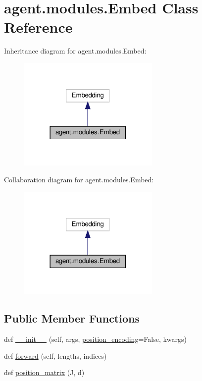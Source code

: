 \hypertarget{classagent_1_1modules_1_1Embed}{}\section{agent.\+modules.\+Embed Class Reference}
\label{classagent_1_1modules_1_1Embed}


Inheritance diagram for agent.\+modules.\+Embed\+:
\nopagebreak
\begin{figure}[H]
\begin{center}
\leavevmode
\includegraphics[width=194pt]{classagent_1_1modules_1_1Embed__inherit__graph}
\end{center}
\end{figure}


Collaboration diagram for agent.\+modules.\+Embed\+:
\nopagebreak
\begin{figure}[H]
\begin{center}
\leavevmode
\includegraphics[width=194pt]{classagent_1_1modules_1_1Embed__coll__graph}
\end{center}
\end{figure}
\subsection*{Public Member Functions}
\begin{DoxyCompactItemize}
\item 
def \hyperlink{classagent_1_1modules_1_1Embed_aeb8a118bbca535fb35d6b5a45c2603c2}{\+\_\+\+\_\+init\+\_\+\+\_\+} (self, args, \hyperlink{classagent_1_1modules_1_1Embed_a482a481bdc736280d0af174a15f6e8ee}{position\+\_\+encoding}=False, kwargs)
\item 
def \hyperlink{classagent_1_1modules_1_1Embed_aecd5510c339a8fd238d56226863dcb81}{forward} (self, lengths, indices)
\item 
def \hyperlink{classagent_1_1modules_1_1Embed_a5efae3b0a1994436b49124274cfc089f}{position\+\_\+matrix} (J, d)
\end{DoxyCompactItemize}
